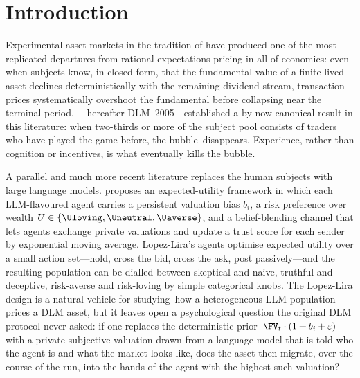 \section{Introduction}
\label{sec:intro}

Experimental asset markets in the tradition of
\citet{smith1988bubbles} have produced one of the most replicated
departures from rational-expectations pricing in all of economics:
even when subjects know, in closed form, that the fundamental value
of a finite-lived asset declines deterministically with the
remaining dividend stream, transaction prices systematically
overshoot the fundamental before collapsing near the terminal
period. \citet{dufwenberg2005bubbles}---hereafter
DLM~2005---established a by now canonical result in this literature:
when two-thirds or more of the subject pool consists of traders who
have played the game before, the bubble~disappears. Experience, rather
than cognition or incentives, is what eventually kills the bubble.

A parallel and much more recent literature replaces the human
subjects with large language models. \citet{lopezlira2025llm}
proposes an expected-utility framework in which each LLM-flavoured
agent carries a persistent valuation bias $b_i$, a risk preference
over wealth $U\in\{\Uloving,\Uneutral,\Uaverse\}$, and a belief-blending
channel that lets agents exchange private valuations and update a
trust score for each sender by exponential moving average. Lopez-Lira's
agents optimise expected utility over a small action set---hold,
cross the bid, cross the ask, post passively---and the resulting
population can be dialled between skeptical and naive, truthful and
deceptive, risk-averse and risk-loving by simple categorical knobs.
The Lopez-Lira design is a natural vehicle for studying~how a
heterogeneous LLM population prices a DLM asset, but it leaves open a
psychological question the original DLM protocol never asked: if one
replaces the deterministic prior~$\FV_t\cdot(1+b_i+\varepsilon)$ with
a private subjective valuation drawn from a language model that is
told who the agent is and what the market looks like, does the asset
then migrate, over the course of the run, into the hands of the
agent with the highest such valuation?

